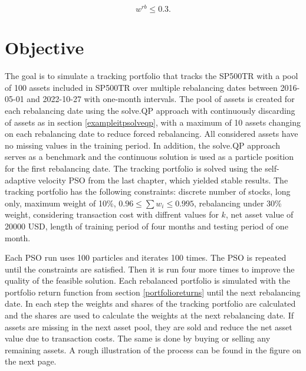 \documentclass[
  oneside, a4paper, 12pt, openany]{book}
\theoremstyle{definition}
\theoremstyle{definition}
\theoremstyle{definition}
\theoremstyle{definition}
\theoremstyle{remark}
\begin{document}
\[
  w^{rb} \leq 0.3.
\]

\hypertarget{objective}{%
\section{Objective}\label{objective}}

The goal is to simulate a tracking portfolio that tracks the SP500TR with a pool of 100 assets included in SP500TR over multiple rebalancing dates between 2016-05-01 and 2022-10-27 with one-month intervals. The pool of assets is created for each rebalancing date using the solve.QP approach with continuously discarding of assets as in section \ref{exampleitpsolveqp}, with a maximum of 10 assets changing on each rebalancing date to reduce forced rebalancing. All considered assets have no missing values in the training period. In addition, the solve.QP approach serves as a benchmark and the continuous solution is used as a particle position for the first rebalancing date. The tracking portfolio is solved using the self-adaptive velocity PSO from the last chapter, which yielded stable results. The tracking portfolio has the following constraints: discrete number of stocks, long only, maximum weight of 10\%, \(0.96 \leq \sum w_i \leq 0.995\), rebalancing under 30\% weight, considering transaction cost with diffrent values for \(k\), net asset value of 20000 USD, length of training period of four months and testing period of one month.

Each PSO run uses 100 particles and iterates 100 times. The PSO is repeated until the constraints are satisfied. Then it is run four more times to improve the quality of the feasible solution. Each rebalanced portfolio is simulated with the portfolio return function from section \ref{portfolioreturns} until the next rebalancing date. In each step the weights and shares of the tracking portfolio are calculated and the shares are used to calculate the weights at the next rebalancing date. If assets are missing in the next asset pool, they are sold and reduce the net asset value due to transaction costs. The same is done by buying or selling any remaining assets. A rough illustration of the process can be found in the figure on the next page.\pagebreak
\end{document}
